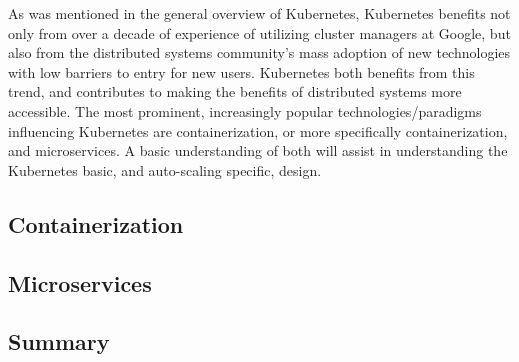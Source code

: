 As was mentioned in the general overview of Kubernetes, Kubernetes benefits not
only from over a decade of experience of utilizing cluster managers at Google,
but also from the distributed systems community's mass adoption of new
technologies with low barriers to entry for new users. Kubernetes both benefits
from this trend, and contributes to making the benefits of distributed systems
more accessible. The most prominent, increasingly popular technologies/paradigms
influencing Kubernetes are containerization, or more specifically
containerization, and microservices. A basic understanding of both will assist
in understanding the Kubernetes basic, and auto-scaling specific, design.

\subsection{Containerization}
\label{architecture-building-blocks-of-kubernetes-containerization}



\subsection{Microservices}
\label{architecture-building-blocks-of-kubernetes-microservices}



\subsection{Summary}


